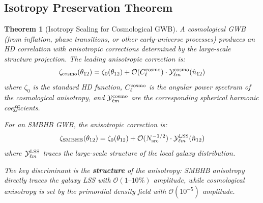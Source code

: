 \documentclass[11pt,a4paper]{article}
\newtheorem{theorem}{Theorem}[section]
\begin{document}
\subsection{Isotropy Preservation Theorem}\label{sec:isotropy}

\begin{theorem}[Isotropy Scaling for Cosmological GWB]\label{thm:isotropy}
A cosmological GWB (from inflation, phase transitions, or other early-universe processes) produces an HD correlation with anisotropic corrections determined by the large-scale structure projection. The leading anisotropic correction is:
\begin{equation}
\zeta_{\rm cosmo}(\theta_{12}) = \zeta_0(\theta_{12}) + \mathcal{O}(C_\ell^{\rm cosmo}) \cdot \mathcal{Y}_{\ell m}^{\rm cosmo}(\hat{n}_{12})
\end{equation}
where $\zeta_0$ is the standard HD function, $C_\ell^{\rm cosmo}$ is the angular power spectrum of the cosmological anisotropy, and $\mathcal{Y}_{\ell m}^{\rm cosmo}$ are the corresponding spherical harmonic coefficients.

For an SMBHB GWB, the anisotropic correction is:
\begin{equation}
\zeta_{\rm SMBHB}(\theta_{12}) = \zeta_0(\theta_{12}) + \mathcal{O}(N_{\rm src}^{-1/2}) \cdot \mathcal{Y}_{\ell m}^{\rm LSS}(\hat{n}_{12})
\end{equation}
where $\mathcal{Y}_{\ell m}^{\rm LSS}$ traces the large-scale structure of the local galaxy distribution.

The key discriminant is the \textbf{structure} of the anisotropy: SMBHB anisotropy directly traces the galaxy LSS with $\mathcal{O}(1\text{--}10\%)$ amplitude, while cosmological anisotropy is set by the primordial density field with $\mathcal{O}(10^{-5})$ amplitude.
\end{theorem}
\end{document}
